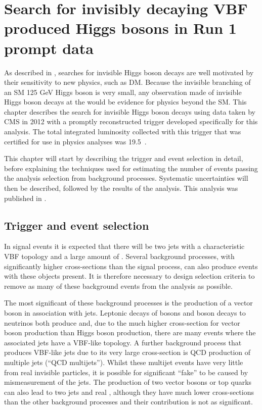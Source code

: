 \chapter{Search for invisibly decaying VBF produced Higgs bosons in Run 1 prompt data}
\label{chap:prompt}
As described in , searches for invisible Higgs boson decays are well motivated by their sensitivity to new physics, such as \ac{DM}. Because the invisible branching of an \ac{SM} 125 GeV Higgs boson is very small, any observation made of invisible Higgs boson decays at the \LHC would be evidence for physics beyond the \ac{SM}. This chapter describes the search for invisible Higgs boson decays using data taken by CMS in 2012 with a promptly reconstructed trigger developed specifically for this analysis. The total integrated luminosity collected with this trigger that was certified for use in physics analyses was 19.5\invfb~.

This chapter will start by describing the trigger and event selection in detail, before explaining the techniques used for estimating the number of events passing the analysis selection from background processes. Systematic uncertainties will then be described, followed by the results of the analysis. This analysis was published in .

\section{Trigger and event selection}%
\label{sec:promptsel}
In signal events it is expected that there will be two jets with a characteristic VBF topology and a large amount of \MET. Several background processes, with significantly higher cross-sections than the signal process, can also produce events with these objects present. It is therefore necessary to design selection criteria to remove as many of these background events from the analysis as possible.

The most significant of these background processes is the production of a vector boson in association with jets. Leptonic decays of \PW bosons and \PZ boson decays to neutrinos both produce \MET and, due to the much higher cross-section for vector boson production than Higgs boson production, there are many events where the associated jets have a VBF-like topology. %
A further background process that produces VBF-like jets due to its very large cross-section is QCD production of multiple jets (``QCD multijets''). Whilst these multijet events have very little \MET from real invisible particles, it is possible for significant ``fake'' \MET to be caused by mismeasurement of the jets. %
The production of two vector bosons or top quarks can also lead to two jets and real \MET, although they have much lower cross-sections than the other background processes and their contribution is not as significant.

